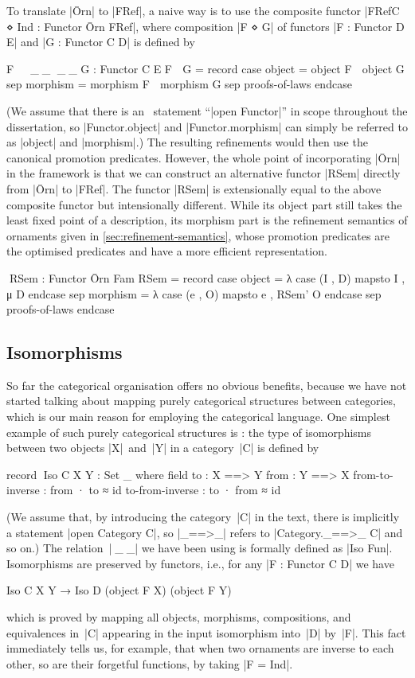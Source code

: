To translate |Ōrn| to |FRef|, a naive way is to use the composite functor |FRefC ⋄ Ind : Functor Ōrn FRef|, where composition |F ⋄ G| of functors |F : Functor D E| and |G : Functor C D| is defined by
\begin{code}
F ^^^⋄ ^^^_⋄_ ^^^_⋄_ G : Functor C E
F ⋄ G = record  case  object    = object F ∘ object G
                sep   morphism  = morphism F ∘ morphism G
                sep   proofs-of-laws endcase
\end{code}
(We assume that there is an \Agda\ statement ``|open Functor|'' in scope throughout the dissertation, so |Functor.object| and |Functor.morphism| can simply be referred to as |object| and |morphism|.)
The resulting refinements would then use the canonical promotion predicates.
However, the whole point of incorporating |Ōrn| in the framework is that we can construct an alternative functor |RSem| directly from |Ōrn| to |FRef|.
The functor |RSem| is extensionally equal to the above composite functor but intensionally different.
While its object part still takes the least fixed point of a description, its morphism part is the refinement semantics of ornaments given in \autoref{sec:refinement-semantics}, whose promotion predicates are the optimised predicates and have a more efficient representation.
\begin{code}
^^^RSem : Functor Ōrn Fam
RSem = record  case  object    =  λ case (I , D) mapsto I , μ D      endcase
               sep   morphism  =  λ case (e , O) mapsto e , RSem' O  endcase
               sep   proofs-of-laws endcase
\end{code}

\subsection{Isomorphisms}
\label{sec:isomorphisms}

So far the categorical organisation offers no obvious benefits, because we have not started talking about mapping purely categorical structures between categories, which is our main reason for employing the categorical language.
One simplest example of such purely categorical structures is : the type of isomorphisms between two objects |X|~and~|Y| in a category~|C| is defined by
\begin{code}
record ^^^Iso C X Y : Set _ where
  field
    to    : X ==> Y
    from  : Y ==> X
    from-to-inverse  : from · to ≈ id
    to-from-inverse  : to · from ≈ id
\end{code}
(We assume that, by introducing the category~|C| in the text, there is implicitly a statement |open Category C|, so |_==>_| refers to |Category._==>_ C| and so on.)
The relation~|^^^_≅_| we have been using is formally defined as |Iso Fun|.
Isomorphisms are preserved by functors, i.e., for any |F : Functor C D| we have
\begin{code}
Iso C X Y → Iso D (object F X) (object F Y)
\end{code}
which is proved by mapping all objects, morphisms, compositions, and equivalences in~|C| appearing in the input isomorphism into~|D| by~|F|.
This fact immediately tells us, for example, that when two ornaments are inverse to each other, so are their forgetful functions, by taking |F = Ind|.

